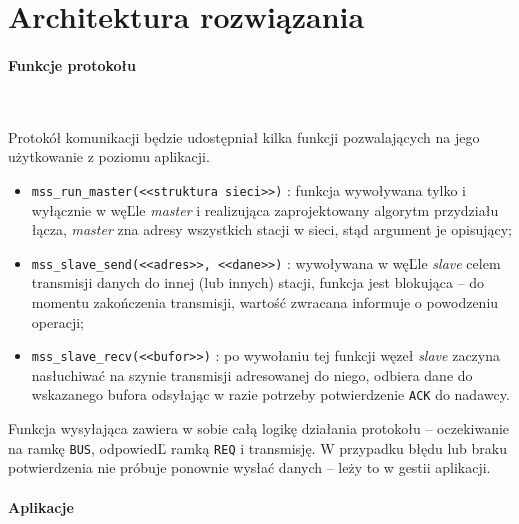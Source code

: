 \documentclass[a4paper,12pt]{article}
\begin{document}
\section{Architektura rozwiązania}

\paragraph{Funkcje protokołu}\

Protokół komunikacji będzie udostępniał kilka funkcji pozwalających na jego
użytkowanie z poziomu aplikacji.
\begin{itemize}
  \item \texttt{mss\_run\_master(\textnormal{<<struktura sieci>>})} : funkcja
        wywoływana tylko i wyłącznie w węĽle \emph{master} i realizująca
        zaprojektowany algorytm przydziału łącza, \emph{master} zna adresy
        wszystkich stacji w sieci, stąd argument je opisujący;
  \item \texttt{mss\_slave\_send(\textnormal{<<adres>>}, \textnormal{<<dane>>})}
        : wywoływana w węĽle \emph{slave} celem transmisji danych do innej
        (lub innych) stacji, funkcja jest blokująca -- do momentu zakończenia
        transmisji, wartość zwracana informuje o powodzeniu operacji;
  \item \texttt{mss\_slave\_recv(\textnormal{<<bufor>>})} : po wywołaniu tej
        funkcji węzeł \emph{slave} zaczyna nasłuchiwać na szynie transmisji
        adresowanej do niego, odbiera dane do wskazanego bufora odsyłając
        w razie potrzeby potwierdzenie \texttt{ACK} do nadawcy.
\end{itemize}
Funkcja wysyłająca zawiera w sobie całą logikę działania protokołu --
oczekiwanie na ramkę \texttt{BUS}, odpowiedĽ ramką \texttt{REQ} i transmisję.
W przypadku błędu lub braku potwierdzenia nie próbuje ponownie wysłać danych
-- leży to w gestii aplikacji.

\paragraph{Aplikacje}\
\end{document}
